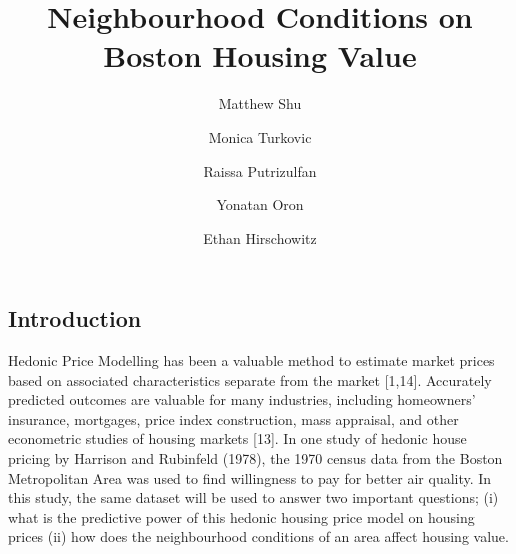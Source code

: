 \documentclass[letterpaper,10pt,twocolumn,twoside,]{pinp}
\title{Neighbourhood Conditions on Boston Housing Value}
\author[a]{Matthew Shu}
\author[a]{Monica Turkovic}
\author[a]{Raissa Putrizulfan}
\author[a]{Yonatan Oron}
\author[a]{Ethan Hirschowitz}
\affil[a]{University of Sydney}
\begin{document}
\verticaladjustment{-2pt}

\maketitle
\thispagestyle{firststyle}



\hypertarget{introduction}{%
\subsection{Introduction}\label{introduction}}

Hedonic Price Modelling has been a valuable method to estimate market
prices based on associated characteristics separate from the market
\citep{HARRISON197881, GOODMAN1978471} {[}1,14{]}. Accurately predicted
outcomes are valuable for many industries, including homeowners'
insurance, mortgages, price index construction, mass appraisal, and
other econometric studies of housing markets {[}13{]}. In one study of
hedonic house pricing by Harrison and Rubinfeld (1978), the 1970 census
data from the Boston Metropolitan Area was used to find willingness to
pay for better air quality. In this study, the same dataset will be used
to answer two important questions; (i) what is the predictive power of
this hedonic housing price model on housing prices (ii) how does the
neighbourhood conditions of an area affect housing value.
\end{document}
